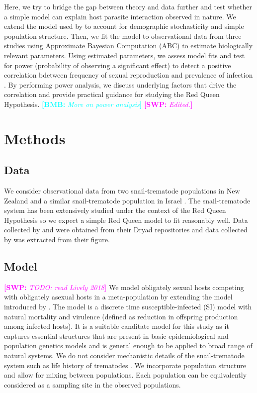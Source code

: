 \documentclass{article}\usepackage[]{graphicx}\usepackage[]{color}
\newcommand{\comment}[3]{\textcolor{#1}{\textbf{[#2: }\textit{#3}\textbf{]}}}
\newcommand{\bmb}[1]{\comment{cyan}{BMB}{#1}}
\newcommand{\swp}[1]{\comment{magenta}{SWP}{#1}}
\begin{document}
Here, we try to bridge the gap between theory and data further and test whether a simple model can explain host parasite interaction observed in nature.
We extend the model used by \cite{lively2010epidemiological} to account for demographic stochasticity and simple population structure.
Then, we fit the model to observational data from three studies \citep{dagan2013clonal, mckone2016fine, vergara2014infection} using Approximate Bayesian Computation (ABC) to estimate biologically relevant parameters.
Using estimated parameters, we assess model fits and test for power (probability of observing a significant effect) to detect a positive correlation bdetween frequency of sexual reproduction and prevalence of infection \cite{lively2001trematode}.
By performing power analysis, we discuss underlying factors that drive the correlation and provide practical guidance for studying the Red Queen Hypothesis.
\bmb{More on power analysis}
\swp{Edited.}

\section{Methods}

\subsection{Data}

We consider observational data from two snail-trematode populations in New Zealand \citep{vergara2014infection, mckone2016fine} and a similar snail-trematode population in Israel \citep{dagan2013clonal}. 
The snail-trematode system has been extensively studied under the context of the Red Queen Hypothesis so we expect a simple Red Queen model to fit reasonably well.
Data collected by \cite{dagan2013clonal} and \cite{vergara2014infection} were obtained from their Dryad repositories \citep{dryad_f5t56, dryad_29nk3_2} and data collected by \cite{mckone2016fine} was extracted from their figure.

\subsection{Model}

\swp{TODO: read Lively 2018}
We model obligately sexual hosts competing with obligately asexual hosts in a meta-population by extending the model introduced by \cite{lively2010epidemiological}.
The model is a discrete time susceptible-infected (SI) model with natural mortality and virulence (defined as reduction in offspring production among infected hosts).
It is a suitable canditate model for this study as it captures essential structures that are present in basic epidemiological and population genetics models and is general enough to be applied to broad range of natural systems.
We do not consider mechanistic details of the snail-trematode system such as life history of trematodes \citep{vergara2014infection}.
We incorporate population structure and allow for mixing between populations.
Each population can be equivalently considered as a sampling site in the observed populations.
\end{document}
